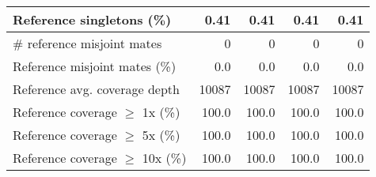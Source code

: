 \documentclass[12pt,a4paper]{article}
\begin{document}
\begin{table}[ht]
\begin{center}
\begin{tabular}{|l*{4}{|r}|}
Reference singletons (\%) & 0.41 & 0.41 & 0.41 & 0.41 \\ \hline
\# reference misjoint mates & 0 & 0 & 0 & 0 \\ \hline
Reference misjoint mates (\%) & 0.0 & 0.0 & 0.0 & 0.0 \\ \hline
Reference avg. coverage depth & 10087 & 10087 & 10087 & 10087 \\ \hline
Reference coverage $\geq$ 1x (\%) & 100.0 & 100.0 & 100.0 & 100.0 \\ \hline
Reference coverage $\geq$ 5x (\%) & 100.0 & 100.0 & 100.0 & 100.0 \\ \hline
Reference coverage $\geq$ 10x (\%) & 100.0 & 100.0 & 100.0 & 100.0 \\ \hline
\end{tabular}
\end{center}
\end{table}
\end{document}

